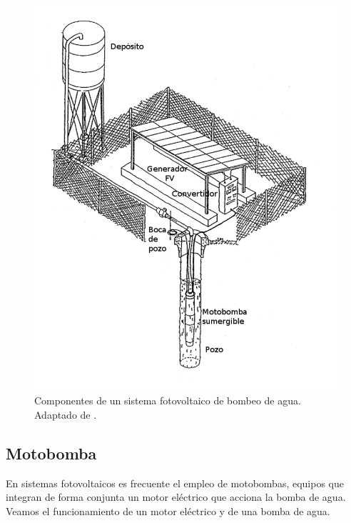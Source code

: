 %
\begin{figure}
\begin{centering}
\includegraphics[scale=0.5]{../figs/EsquemaBombeo_oscar}
\end{centering}

\caption[Componentes de un sistema fotovoltaico de bombeo de agua.]{\label{fig:ComponentesSFB} Componentes de un sistema fotovoltaico
de bombeo de agua. Adaptado de \cite{Lorenzo.Narvarte2006}.}

\end{figure}



\subsection{Motobomba}

En sistemas fotovoltaicos es frecuente el empleo de motobombas, equipos
que integran de forma conjunta un motor eléctrico que acciona la bomba
de agua. Veamos el funcionamiento de un motor eléctrico y de una bomba
de agua. 


